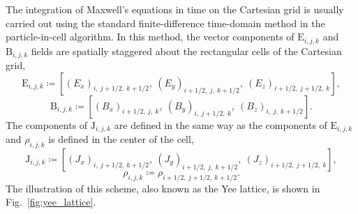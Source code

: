 \documentclass[10pt, a4paper, twoside, openright]{report}
\renewcommand{\vec}[1]{\boldsymbol{\mathrm{#1}}}
\begin{document}
The integration of Maxwell's equations in time on the Cartesian grid is usually carried out using the standard finite-difference time-domain method \cite{Yee1966} in the particle-in-cell algorithm. In this method, the vector components of $ \vec{E}_{i, j, k} $ and $ \vec{B}_{i, j, k} $ fields are spatially staggered about the rectangular cells of the Cartesian grid,
\begin{equation}
	\label{eq:staggered_E}
	\vec{E}_{i, j, k} \coloneqq \left[\left(E_{x}\right)_{i,\: j + 1/2,\: k + 1/2}, \ \left(E_{y}\right)_{i + 1/2,\: j,\: k + 1/2}, \ \left(E_{z}\right)_{i + 1/2,\: j + 1/2,\: k} \right],
\end{equation}
\begin{equation}
	\label{eq:staggered_B}
	\vec{B}_{i, j, k} \coloneqq \left[\left(B_{x}\right)_{i + 1/2,\: j,\: k}, \ \left(B_{y}\right)_{i,\: j + 1/2,\: k}, \ \left(B_{z}\right)_{i,\: j,\: k + 1/2} \right].
\end{equation}
The components of $ \vec{J}_{i, j, k} $ are defined in the same way as the components of $ \vec{E}_{i, j, k} $ and $ \rho_{i, j, k} $ is defined in the center of the cell,
\begin{equation}\label{eq:staggered_J}
	\vec{J}_{i, j, k} \coloneqq \left[\left(J_{x}\right)_{i,\: j + 1/2,\: k + 1/2}, \ \left(J_{y}\right)_{i + 1/2,\: j,\: k + 1/2}, \ \left(J_{z}\right)_{i + 1/2,\: j + 1/2,\: k} \right],
\end{equation}
\begin{equation}\label{eq:staggered_rho}
	\rho_{i, j, k} \coloneqq \rho_{i + 1/2,\: j + 1/2,\: k + 1/2}.
\end{equation}
The illustration of this scheme, also known as the Yee lattice, is shown in Fig.~\ref{fig:yee_lattice}. 
\end{document}
